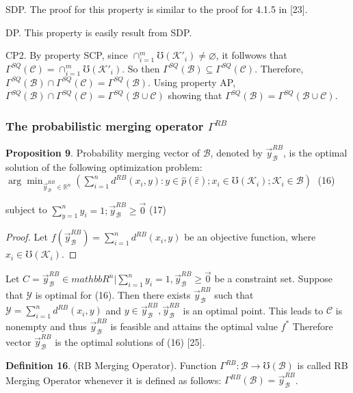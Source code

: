 \documentclass[]{iosart2c}
\begin{document}
SDP. The proof for this property is similar to the proof for 4.1.5 in [23].

DP. This property is easily result from SDP. 

CP2. By property SCP, since $\cap^m_{i=1}\mho(\mathcal{K}'_i) \neq \varnothing$,
it follwows that $\Gamma^{SQ}(\mathcal{C}) = \cap^m_{i=1}\mho(\mathcal{K}'_i)$. So then
$\Gamma^{SQ}(\mathcal{B}) \subseteq \Gamma^{SQ}(\mathcal{C})$. Therefore, $\Gamma^{SQ}(\mathcal{B}) \cap \Gamma^{SQ}(\mathcal{C}) =
\Gamma^{SQ}(\mathcal{B})$. Using property AP, $\Gamma^{SQ}(\mathcal{B}) \cap \Gamma^{SQ}(\mathcal{C}) = \Gamma^{SQ}(\mathcal{B} \cup \mathcal{C})$
showing that $\Gamma^{SQ}(\mathcal{B}) = \Gamma^{SQ}(\mathcal{B} \cup \mathcal{C})$.

\subsubsection{The probabilistic merging operator $\Gamma ^{RB}$}
\textbf{Proposition 9}. Probability merging vector of $\mathcal{B}$,
denoted by $\vec{y}^{RB}_\mathcal{B}$, is the optimal solution of the following optimization problem:
$\arg \min_{\vec{y}^{RB}_\mathcal{B} \in \mathbb{R}^n} \left( \sum^n_{i=1} d^{RB}(x_i, y) :
y \in \hat{p}(\hat{\varepsilon}); x_i \in \mho(\mathcal{K}_i);\mathcal{K}_i \in \mathcal{B} \right)$ (16)

subject to $\sum^n_{y=1} y_i= 1; \vec{y}^{RB}_\mathcal{B} \geq \vec{0}$ (17)

\begin{proof}Let $f(\vec{y}^{RB}_\mathcal{B}) = \sum^n_{i=1} d^{RB}(x_i,y)$ be an objective function, where $x_i \in \mho(\mathcal{K}_i)$.
\end{proof}
Let $C = { \vec{y}^{RB}_\mathcal{B} \in mathbb{R}^n|\sum^n_{i=1} y_i = 1, \vec{y}^{RB}_\mathcal{B} \geq \vec{0} }$ be
a constraint set. Suppose that $\mathcal{Y}$ is optimal for (16).
Then there exists $\vec{y}^{RB}_\mathcal{B}$ such that $\mathcal{Y} = \sum^n_{i=1} d^{RB}(x_i, y)$
and $y \in \vec{y}^{RB}_\mathcal{B} , \vec{y}^{RB}_\mathcal{B}$ is an optimal point. This leads to $\mathcal{C}$
is nonempty and thus $\vec{y}^{RB}_\mathcal{B}$ is feasible and attains the
optimal value $f^*$ Therefore vector $\vec{y}^{RB}_\mathcal{B}$ is the optimal
solutions of (16) [25].

\textbf{Definition 16}. (RB Merging Operator). Function 
$\Gamma^{RB} : \mathcal{B} \to \mho(\mathcal{B})$ is called RB Merging Operator
whenever it is defined as follows: $\Gamma^{RB}(\mathcal{B}) = \vec{y}^{RB}_\mathcal{B}$.
\end{document}
